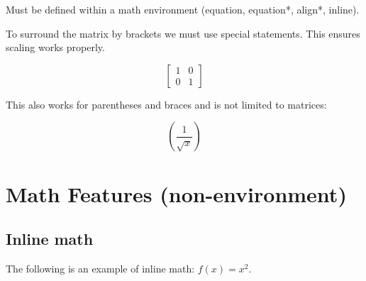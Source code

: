 \documentclass{article}
\begin{document}
Must be defined within a math environment (equation, equation*, align*, inline).

To surround the matrix by brackets we must use special statements. This ensures scaling works properly.

\begin{equation*}
	\left[
	\begin{matrix}
		1 & 0\\
		0 & 1
	\end{matrix}
	\right]
\end{equation*}

This also works for parentheses and braces and is not limited to matrices:

\begin{equation*}
	\left(\frac{1}{\sqrt{x}}\right)
\end{equation*}

\section{Math Features (non-environment)}

\subsection{Inline math}
The following is an example of inline math: $f(x) = x^2$.
\end{document}

